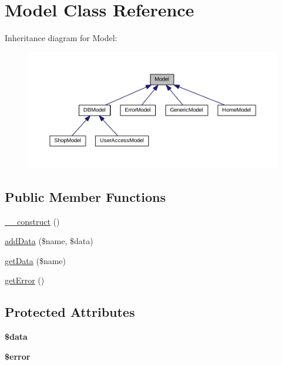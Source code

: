 \hypertarget{classModel}{\section{Model Class Reference}
\label{classModel}
}


Inheritance diagram for Model\+:
\nopagebreak
\begin{figure}[H]
\begin{center}
\leavevmode
\includegraphics[width=350pt]{classModel__inherit__graph}
\end{center}
\end{figure}
\subsection*{Public Member Functions}
\begin{DoxyCompactItemize}
\item 
\hyperlink{classModel_a655d64396144aad24a62132fa11b92ea}{\+\_\+\+\_\+construct} ()
\item 
\hyperlink{classModel_af422ec4a1428678240da4e751f942b9c}{add\+Data} (\$name, \$data)
\item 
\hyperlink{classModel_a8e1cba2731a082294561ce1b499f3402}{get\+Data} (\$name)
\item 
\hyperlink{classModel_a0372eec1043cef6e9b6a50220cb0b031}{get\+Error} ()
\end{DoxyCompactItemize}
\subsection*{Protected Attributes}
\begin{DoxyCompactItemize}
\item 
\hypertarget{classModel_ae04c729239482d90601ba5c9d6a4fc66}{{\bfseries \$data}}\label{classModel_ae04c729239482d90601ba5c9d6a4fc66}

\item 
\hypertarget{classModel_a4c02091587027b71fed8b3ff0a96748b}{{\bfseries \$error}}\label{classModel_a4c02091587027b71fed8b3ff0a96748b}

\end{DoxyCompactItemize}



